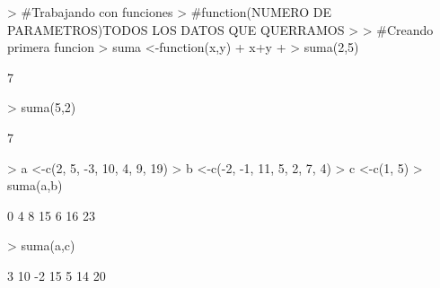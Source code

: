 \documentclass{article}
\begin{document}


\begin{Schunk}
\begin{Sinput}
> #Trabajando con funciones
> #function(NUMERO DE PARAMETROS){TODOS LOS DATOS QUE QUERRAMOS}
> 
> #Creando primera funcion
> suma <-function(x,y){
+   x+y
+ }
> suma(2,5)
\end{Sinput}
\begin{Soutput}
[1] 7
\end{Soutput}
\begin{Sinput}
> suma(5,2)
\end{Sinput}
\begin{Soutput}
[1] 7
\end{Soutput}
\begin{Sinput}
> a <-c(2, 5, -3, 10, 4, 9, 19)
> b <-c(-2, -1, 11, 5, 2, 7, 4)
> c <-c(1, 5)
> suma(a,b)
\end{Sinput}
\begin{Soutput}
[1]  0  4  8 15  6 16 23
\end{Soutput}
\begin{Sinput}
> suma(a,c)
\end{Sinput}
\begin{Soutput}
[1]  3 10 -2 15  5 14 20
\end{Soutput}
\end{Schunk}
\end{document}
